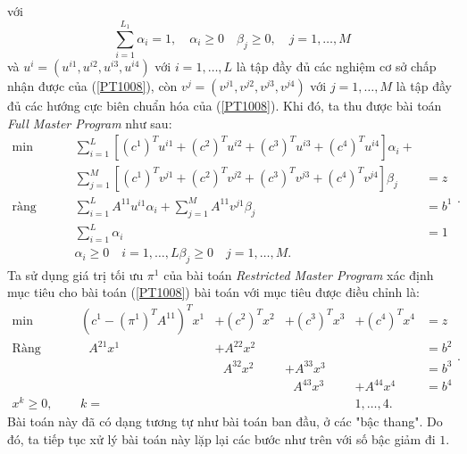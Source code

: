 với
\begin{displaymath}\label{1010}
\sum_{i=1}^{L_1}\alpha_i=1,\quad \alpha_i\geq0\quad \beta_j\geq0,\quad j=1,\dots,M
\end{displaymath}
và $u^i=(u^{i1},u^{i2},u^{i3},u^{i4})$ với $i=1,\dots,L$ là tập đầy đủ các nghiệm cơ sở chấp nhận được của (\ref{PT1008}), còn $v^j=(v^{j1},v^{j2},v^{j3},v^{j4})$ với $j=1,\dots,M$  là tập đầy đủ các hướng cực biên chuẩn hóa của (\ref{PT1008}). Khi đó, ta thu được bài toán {\it Full Master Program} như sau:
\begin{equation}\label{PT1011}
\begin{array}{llllll}
\min& \sum_{i=1}^{L}[(c^1)^Tu^{i1} + (c^2)^Tu^{i2} + (c^3)^Tu^{i3} + (c^4)^T u^{i4}]\alpha_i +\\
&\sum_{j=1}^{M}[(c^1)^Tv^{j1} + (c^2)^Tv^{j2} + (c^3)^Tv^{j3} + (c^4)^T v^{j4}]\beta_j&= z \\
\text{ràng buộc:}& \sum_{i=1}^LA^{11}u^{i1}\alpha_i+\sum_{j=1}^MA^{11}v^{j1}\beta_j&=b^1\\
&\sum_{i=1}^L\alpha_i&=1\\
&\alpha_i\geq0 \quad i=1,\dots,L \beta_j\geq0\quad j=1,\dots,M.
\end{array}.
\end{equation}
Ta sử dụng giá trị tối ưu $\pi^1$ của bài toán {\it Restricted Master Program} xác định mục tiêu cho bài toán (\ref{PT1008}) bài toán với mục tiêu được điều chỉnh là:
\begin{equation}\label{PT1012}
\begin{array}{lllllll}
\min & (c^1-(\pi^1)^TA^{11})^Tx^1 &+ (c^2)^Tx^2 &+ (c^3)^Tx^3 &+ (c^4)^T x^4 &= z \\
\text{Ràng buộc}&\mbox{  }A^{21} x^1 &+A^{22} x^2 & & & = b^2\\
& &\mbox{  }A^{32} x^2 &+A^{33} x^3 & & = b^3\\
& & &\mbox{  }A^{43} x^3 &+A^{44} x^4 & = b^4\\
x^k \geq 0, & k = & & &1, \ldots, 4.
\end{array}.
\end{equation}
Bài toán này đã có dạng tương tự như bài toán ban đầu, ở các "bậc thang". Do đó, ta tiếp tục xử lý bài toán này lặp lại các bước như trên với số bậc giảm đi $1$.

